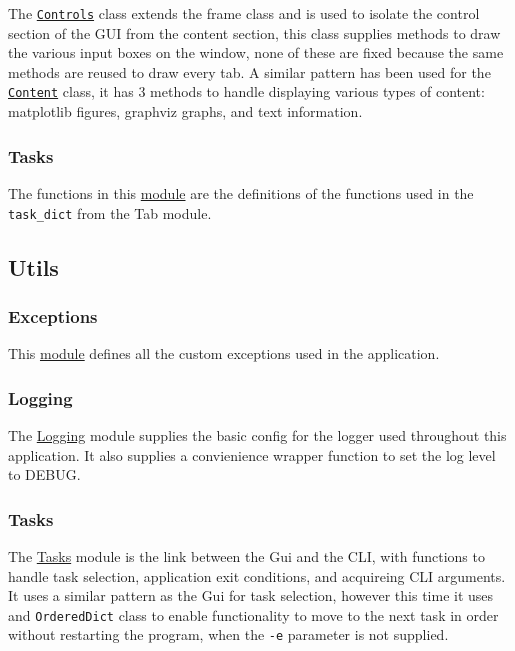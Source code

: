 \documentclass[11pt]{article}
\newcommand{\code}[1]{\colorbox{light-gray}{\texttt{#1}}}
\begin{document}
The \href{https://www2.macs.hw.ac.uk/~sf52/DocuTrace/html/DocuTrace.Gui.html#DocuTrace.Gui.Tab.Controls}{\code{Controls}} class extends the frame class and is used to isolate the control section of the GUI from the content section, this class supplies methods to draw the various input boxes on the window, none of these are fixed because the same methods are reused to draw every tab.
A similar pattern has been used for the \href{https://www2.macs.hw.ac.uk/~sf52/DocuTrace/html/DocuTrace.Gui.html#DocuTrace.Gui.Tab.Content}{\code{Content}} class, it has 3 methods to handle displaying various types of content: matplotlib figures, graphviz graphs, and text information.

\subsubsection{Tasks}
The functions in this \href{https://www2.macs.hw.ac.uk/~sf52/DocuTrace/html/DocuTrace.Gui.html#module-DocuTrace.Gui.Tasks}{module} are the definitions of the functions used in the \code{task\_dict} from the Tab module. 

\subsection{Utils}
\subsubsection{Exceptions}
This \href{https://www2.macs.hw.ac.uk/~sf52/DocuTrace/html/DocuTrace.Utils.html#module-DocuTrace.Utils.Exceptions}{module} defines all the custom exceptions used in the application.

\subsubsection{Logging}
The \href{https://www2.macs.hw.ac.uk/~sf52/DocuTrace/html/DocuTrace.Utils.html#module-DocuTrace.Utils.Logging}{Logging} module supplies the basic config for the logger used throughout this application.
It also supplies a convienience wrapper function to set the log level to DEBUG.


\subsubsection{Tasks}
The \href{https://www2.macs.hw.ac.uk/~sf52/DocuTrace/html/DocuTrace.Utils.html#module-DocuTrace.Utils.Tasks}{Tasks} module is the link between the Gui and the CLI, with functions to handle task selection, application exit conditions, and acquireing CLI arguments.
It uses a similar pattern as the Gui for task selection, however this time it uses and \code{OrderedDict} class to enable functionality to move to the next task in order without restarting the program, when the \code{-e} parameter is not supplied.
\end{document}
